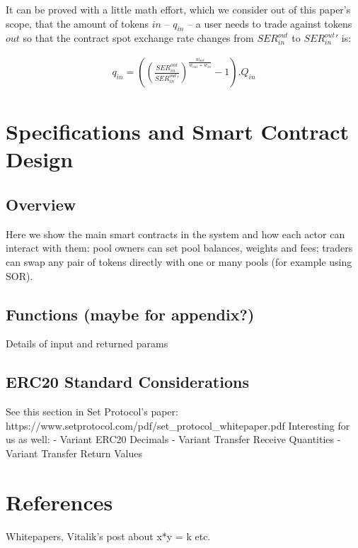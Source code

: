 \documentclass[11pt]{amsart}
\begin{document}
It can be proved with a little math effort, which we consider out of this paper's scope, that the amount of tokens $in$ -- $q_{in}$ -- a user needs to trade against tokens $out$ so that the contract spot exchange rate changes from $SER^{out}_{in}$ to $SER^{out}_{in}'$ is:

\begin{equation}
\begin{gathered}
q_{in} = \left(\left(\frac{SER^{out}_{in}}{SER^{out}_{in}'}\right)^\frac{w_{out}}{w_{out}+w_{in}} - 1 \right).Q_{in}
\end{gathered}
\end{equation}

\section{Specifications and Smart Contract Design}

\subsection{Overview}
Here we show the main smart contracts in the system and how each actor can interact with them: pool owners can set pool balances, weights and fees; traders can swap any pair of tokens directly with one or many pools (for example using SOR).

\subsection{Functions (maybe for appendix?)}
Details of input and returned params

\subsection{ERC20 Standard Considerations}
See this section in Set Protocol's paper: https://www.setprotocol.com/pdf/set\_protocol\_whitepaper.pdf
Interesting for us as well: 
- Variant ERC20 Decimals
- Variant Transfer Receive Quantities
- Variant Transfer Return Values


\section{References}
Whitepapers, Vitalik's post about x*y = k etc.
\end{document}
